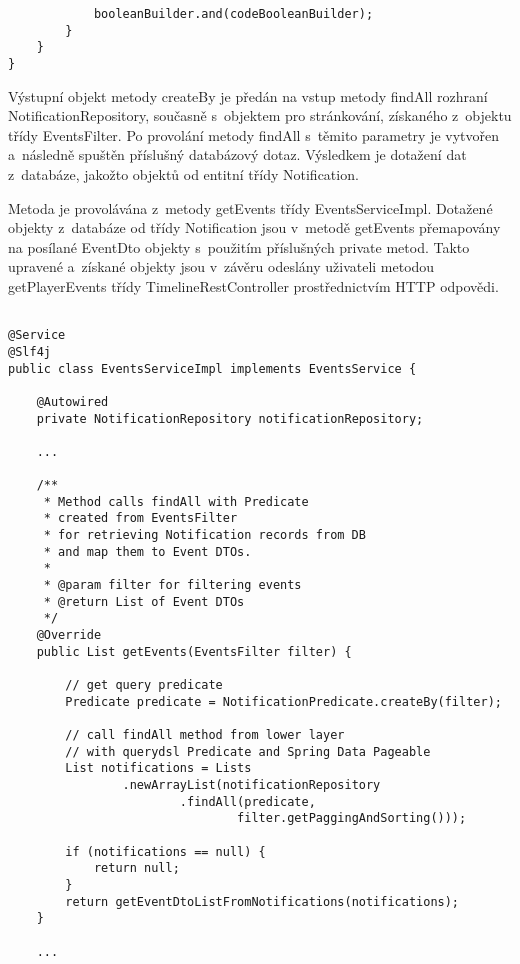 \documentclass[12pt]{article}
\begin{document}
{\begin{lstlisting}
            booleanBuilder.and(codeBooleanBuilder);
        }
    }
}
\end{lstlisting}

Výstupní objekt metody createBy je předán na vstup metody findAll rozhraní NotificationRepository,
současně s~objektem pro stránkování, získaného z~objektu třídy EventsFilter. 
Po provolání metody findAll s~těmito parametry je vytvořen a~následně spuštěn příslušný databázový dotaz.
Výsledkem je dotažení dat z~databáze, jakožto objektů od entitní třídy Notification.

Metoda je provolávána z~metody getEvents třídy EventsServiceImpl.
Dotažené objekty z~databáze od třídy Notification jsou v~metodě getEvents
přemapovány na posílané EventDto objekty s~použitím příslušných private metod.
Takto upravené a~získané objekty jsou v~závěru odeslány uživateli metodou getPlayerEvents
třídy TimelineRestController prostřednictvím HTTP odpovědi.


\clearpage

\begin{lstlisting}

@Service
@Slf4j
public class EventsServiceImpl implements EventsService {

    @Autowired
    private NotificationRepository notificationRepository;
    
    ...
    
    /**
     * Method calls findAll with Predicate
     * created from EventsFilter
     * for retrieving Notification records from DB
     * and map them to Event DTOs.
     *
     * @param filter for filtering events
     * @return List of Event DTOs
     */
    @Override
    public List getEvents(EventsFilter filter) {

        // get query predicate
        Predicate predicate = NotificationPredicate.createBy(filter);

        // call findAll method from lower layer
        // with querydsl Predicate and Spring Data Pageable
        List notifications = Lists
                .newArrayList(notificationRepository
                        .findAll(predicate,
                                filter.getPaggingAndSorting()));

        if (notifications == null) {
            return null;
        }
        return getEventDtoListFromNotifications(notifications);
    }
    
    ...

\end{lstlisting}


}
\end{document}

